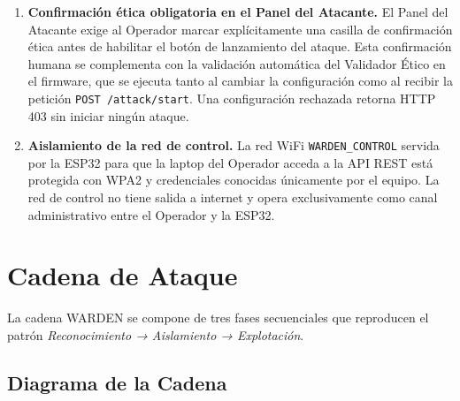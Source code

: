 \documentclass[11pt,a4paper]{article}
\begin{document}
\begin{enumerate}
    ofensivo se publica únicamente con propósitos académicos y se
    acompaña siempre de su documentación, incluyendo este threat model.
  \item \textbf{Confirmación ética obligatoria en el Panel del Atacante.}
    El Panel del Atacante exige al Operador marcar explícitamente una
    casilla de confirmación ética antes de habilitar el botón de
    lanzamiento del ataque. Esta confirmación humana se complementa con
    la validación automática del Validador Ético en el firmware, que
    se ejecuta tanto al cambiar la configuración como al recibir la
    petición \texttt{POST /attack/start}. Una configuración rechazada
    retorna HTTP 403 sin iniciar ningún ataque.
  \item \textbf{Aislamiento de la red de control.} La red WiFi
    \texttt{WARDEN\_CONTROL} servida por la ESP32 para que la laptop
    del Operador acceda a la API REST está protegida con WPA2 y
    credenciales conocidas únicamente por el equipo. La red de control
    no tiene salida a internet y opera exclusivamente como canal
    administrativo entre el Operador y la ESP32.
\end{enumerate}

\section{Cadena de Ataque}

La cadena WARDEN se compone de tres fases secuenciales que reproducen el
patrón \emph{Reconocimiento → Aislamiento → Explotación}.

\subsection{Diagrama de la Cadena}
\end{document}
